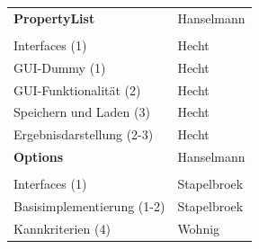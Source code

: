 \documentclass[a4paper]{scrreprt}
\begin{document}
\begin{tabular}{ | p{7cm} | p{7cm} |}
	\rule{0pt}{15pt}\textbf {PropertyList} & Hanselmann\\
	&\\
	\hline
	Interfaces (1) & Hecht\\
	\hline
	GUI-Dummy (1) & Hecht\\
	\hline
	GUI-Funktionalität (2)& Hecht\\
	\hline
	Speichern und Laden (3)& Hecht\\
	\hline
	Ergebnisdarstellung (2-3) & Hecht\\
	\hline	
	
	\rule{0pt}{15pt}\textbf {Options} & Hanselmann\\
	&\\
	\hline
	Interfaces (1) & Stapelbroek\\
	\hline
	Basisimplementierung (1-2) & Stapelbroek\\
	\hline
	Kannkriterien (4) & Wohnig \\
	\hline
	
\end{tabular}\\
\\
\end{document}
